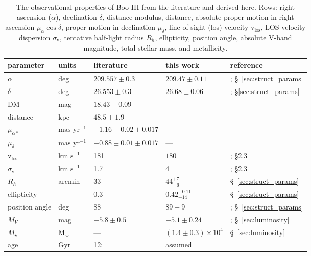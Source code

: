 \documentclass{aa}
\newcommand{\boo}{Boo III}
\newcommand{\pmra}{\ensuremath{\mu_{\alpha*}}}
\newcommand{\pmdec}{\ensuremath{\mu_\delta}}
\newcommand{\masyr}{\ensuremath{\textrm{mas yr}^{-1}}}
\newcommand{\kms}{\ensuremath{\textrm{km s}^{-1}}}
\newcommand{\vlos}{\ensuremath{\mathrm{v}_\text{los}}}
\newcommand{\Mo}{\ensuremath{\mathrm{M}_\sun}}
\newcommand{\sigmav}{\ensuremath{\sigma_\mathrm{v}}}
\begin{document}
\begin{table}
    \centering
    \begin{tabular}{l l l l l}
        \hline\hline
        parameter & units & literature & this work & reference \\
        \hline
        $\alpha$ & deg & $209.557 \pm 0.3$ & $209.47 \pm 0.11$ & \citet{li+2026}; \S~\ref{sec:struct_params} \\
        $\delta$ & deg & $26.553 \pm 0.3$ & $26.68 \pm 0.06$ &\citet{li+2026}; \S \ref{sec:struct_params}\\
        DM & mag & $18.43 \pm 0.09$ & --- & \citet{li+2026} \\
        distance & kpc & $48.5 \pm 1.9$ & --- & \citet{li+2026} \\
        $\pmra$ & $\masyr$ & $-1.16 \pm 0.02 \pm 0.017$ & --- &  \citet{battaglia+2022} \\
        $\pmdec$ & $\masyr$ & $-0.88  \pm 0.01 \pm 0.017$ & --- & \citet{battaglia+2022} \\
        $\vlos$ & $\kms$ & 181 & $180$ & \citet{li+2026}; \S 2.3 \\
        $\sigmav$ & $\kms$ & 1.7 & 4 & \citet{li+2026}; \S 2.3 \\
        $R_h$ & arcmin & 33 & $44_{-6}^{+7}$ & \S~\ref{sec:struct_params}\\
        ellipticity & --- & 0.3 & $0.42_{-14}^{+0.11}$ & \S~\ref{sec:struct_params}\\
        position angle & deg & 88 & $89 \pm 9$ & \citet{moskowitz+walker2020}; \S~\ref{sec:struct_params}\\
        $M_V$ & mag & $-5.8\pm0.5$ & $-5.1 \pm 0.24$ & \citet{moskowitz+walker2020}; \S~\ref{sec:luminosity} \\
        $M_\star$ & $\Mo$ & --- & $(1.4 \pm 0.3) \times 10^4$ & \S~\ref{sec:luminosity} \\
        age & Gyr & 12: & assumed \\
        \hline
    \end{tabular}

    \caption{The observational properties of \boo{} from the literature and derived here.
        Rows: right ascension ($\alpha$), declination $\delta$, distance modulus, distance, absolute proper motion in right ascension $\mu_\alpha \cos\delta$, proper motion in declination $\mu_\delta$, line of sight (los) velocity $\mathrm{v_{los}}$, LOS velocity dispersion $\sigmav$, tentative half-light radius $R_h$, ellipticity, position angle, absolute V-band magnitude, total stellar mass, and metallicity.\\
    }
    \label{tab:obs_props}
\end{table}
\end{document}
